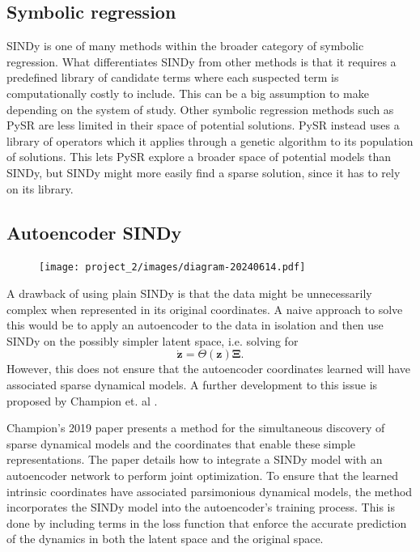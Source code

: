 \subsection{Symbolic regression}
SINDy is one of many methods within the broader category of symbolic regression. What differentiates SINDy from other methods is that it requires a predefined library of candidate terms where each suspected term is computationally costly to include. This can be a big assumption to make depending on the system of study. Other symbolic regression methods such as PySR \cite{cranmer2020discovering} are less limited in their space of potential solutions. PySR instead uses a library of operators which it applies through a genetic algorithm to its population of solutions. This lets PySR explore a broader space of potential models than SINDy, but SINDy might more easily find a sparse solution, since it has to rely on its library.

\subsection{Autoencoder SINDy}

\begin{figure}[H]
    \centering
    \texttt{[image: project\_2/images/diagram-20240614.pdf]}
    \caption{}
    \label{fig:autoencoder_diagram}
\end{figure}

A drawback of using plain SINDy is that the data might be unnecessarily complex when represented in its original coordinates. A naive approach to solve this would be to apply an autoencoder to the data in isolation and then use SINDy on the possibly simpler latent space, i.e. solving for
\begin{equation}
    \dot{\mathbf{z}}=\Theta(\mathbf{z}) \boldsymbol{\Xi}.
\end{equation}
However, this does not ensure that the autoencoder coordinates learned will have associated sparse dynamical models. A further development to this issue is proposed by Champion et. al \cite{Champion_2019}. 

Champion's 2019 paper presents a method for the simultaneous discovery of sparse dynamical models and the coordinates that enable these simple representations. The paper details how to integrate a SINDy model with an autoencoder network to perform joint optimization. To ensure that the learned intrinsic coordinates have associated parsimonious dynamical models, the method incorporates the SINDy model into the autoencoder's training process. This is done by including terms in the loss function that enforce the accurate prediction of the dynamics in both the latent space and the original space. 


